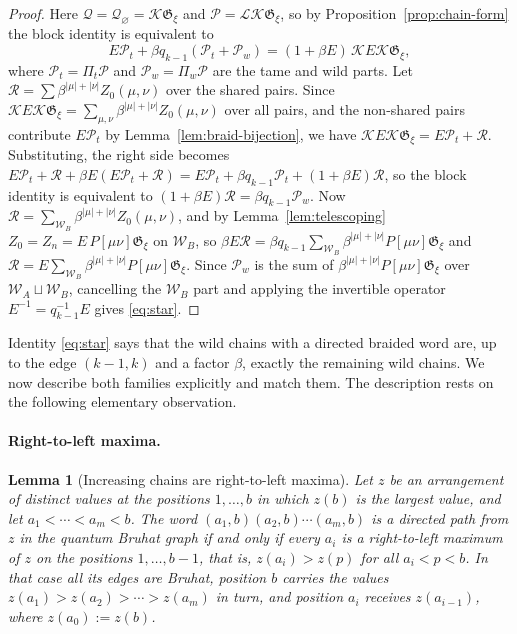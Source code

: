 \documentclass[11pt]{article}
\newtheorem{lemma}[proposition]{Lemma}
\newcommand{\G}{\mathfrak{G}}
\begin{document}
\begin{proof}
Here $\mathcal Q=\mathcal Q_\varnothing=\mathcal K\G_\xi$ and
$\mathcal P=\mathcal L\mathcal K\G_\xi$, so by
Proposition~\ref{prop:chain-form} the block identity is equivalent to
\[
 E\mathcal P_t+\beta q_{k-1}(\mathcal P_t+\mathcal P_w)=(1+\beta E)\,\mathcal KE\mathcal K\G_\xi,
\]
where $\mathcal P_t=\Pi_t\mathcal P$ and $\mathcal P_w=\Pi_w\mathcal P$
are the tame and wild parts. Let
$\mathcal R=\sum\beta^{|\mu|+|\nu|}Z_0(\mu,\nu)$ over the shared
pairs. Since $\mathcal K E\mathcal K\G_\xi=\sum_{\mu,\nu}\beta^{|\mu|+|\nu|}Z_0(\mu,\nu)$
over all pairs, and the non-shared pairs contribute
$E\mathcal P_t$ by Lemma~\ref{lem:braid-bijection}, we have
$\mathcal K E\mathcal K\G_\xi=E\mathcal P_t+\mathcal R$. Substituting,
the right side becomes
$E\mathcal P_t+\mathcal R+\beta E(E\mathcal P_t+\mathcal R)
 =E\mathcal P_t+\beta q_{k-1}\mathcal P_t+(1+\beta E)\mathcal R$,
so the block identity is equivalent to
$(1+\beta E)\mathcal R=\beta q_{k-1}\mathcal P_w$. Now
$\mathcal R=\sum_{\mathcal W_B}\beta^{|\mu|+|\nu|}Z_0(\mu,\nu)$, and by
Lemma~\ref{lem:telescoping} $Z_0=Z_n=E\,P[\mu\nu]\G_\xi$ on
$\mathcal W_B$, so
$\beta E\mathcal R=\beta q_{k-1}\sum_{\mathcal W_B}\beta^{|\mu|+|\nu|}P[\mu\nu]\G_\xi$
and $\mathcal R=E\sum_{\mathcal W_B}\beta^{|\mu|+|\nu|}P[\mu\nu]\G_\xi$.
Since $\mathcal P_w$ is the sum of $\beta^{|\mu|+|\nu|}P[\mu\nu]\G_\xi$
over $\mathcal W_A\sqcup\mathcal W_B$, cancelling the $\mathcal W_B$
part and applying the invertible operator $E^{-1}=q_{k-1}^{-1}E$ gives
\eqref{eq:star}.
\end{proof}

Identity \eqref{eq:star} says that the wild chains with a directed
braided word are, up to the edge $(k-1,k)$ and a factor $\beta$,
exactly the remaining wild chains. We now describe both families
explicitly and match them. The description rests on the following
elementary observation.

\paragraph{Right-to-left maxima.}

\begin{lemma}[Increasing chains are right-to-left maxima]\label{lem:rlmax}
Let $z$ be an arrangement of distinct values at the positions
$1,\ldots,b$ in which $z(b)$ is the largest value, and let
$a_1<\cdots<a_m<b$. The word $(a_1,b)(a_2,b)\cdots(a_m,b)$ is a
directed path from $z$ in the quantum Bruhat graph if and only if
every $a_i$ is a right-to-left maximum of $z$ on the positions
$1,\ldots,b-1$, that is, $z(a_i)>z(p)$ for all $a_i<p<b$. In that
case all its edges are Bruhat, position $b$ carries the values
$z(a_1)>z(a_2)>\cdots>z(a_m)$ in turn, and position $a_i$ receives
$z(a_{i-1})$, where $z(a_0):=z(b)$.
\end{lemma}
\end{document}
